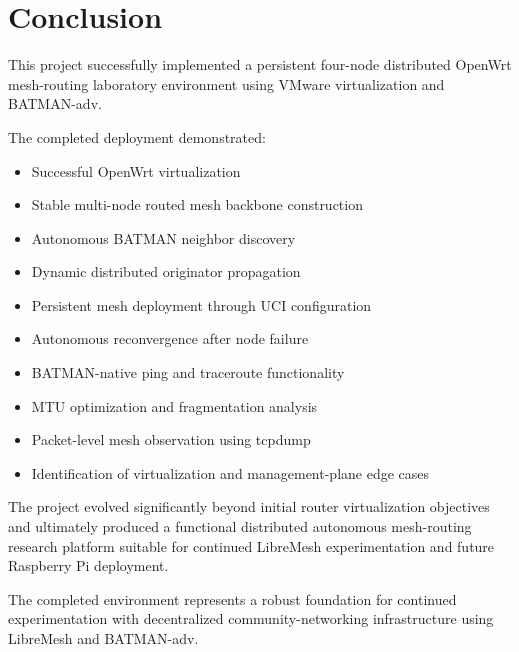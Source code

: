 \documentclass[conference]{IEEEtran}
\begin{document}
\section{Conclusion}

This project successfully implemented a persistent four-node distributed OpenWrt mesh-routing laboratory environment using VMware virtualization and BATMAN-adv.

The completed deployment demonstrated:

\begin{itemize}
    \item Successful OpenWrt virtualization
    \item Stable multi-node routed mesh backbone construction
    \item Autonomous BATMAN neighbor discovery
    \item Dynamic distributed originator propagation
    \item Persistent mesh deployment through UCI configuration
    \item Autonomous reconvergence after node failure
    \item BATMAN-native ping and traceroute functionality
    \item MTU optimization and fragmentation analysis
    \item Packet-level mesh observation using tcpdump
    \item Identification of virtualization and management-plane edge cases
\end{itemize}

The project evolved significantly beyond initial router virtualization objectives and ultimately produced a functional distributed autonomous mesh-routing research platform suitable for continued LibreMesh experimentation and future Raspberry Pi deployment.

The completed environment represents a robust foundation for continued experimentation with decentralized community-networking infrastructure using LibreMesh and BATMAN-adv.


\end{document}
